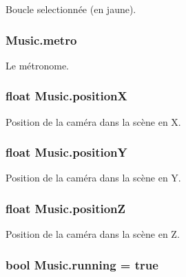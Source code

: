 Boucle selectionnée (en jaune). 

\hypertarget{class_music_a64db98945116f90a7af2ef7eec3cf232}{}
\subsubsection[{metro}]{ Music.\+metro}\label{class_music_a64db98945116f90a7af2ef7eec3cf232}


Le métronome. 

\hypertarget{class_music_a70cf89c5732793d69cce59b44b3e47f4}{}
\subsubsection[{position\+X}]{\setlength{\rightskip}{0pt plus 5cm}float Music.\+position\+X}\label{class_music_a70cf89c5732793d69cce59b44b3e47f4}


Position de la caméra dans la scène en X. 

\hypertarget{class_music_a4d7d0c2af4148f072c1fb3ef94bbdc13}{}
\subsubsection[{position\+Y}]{\setlength{\rightskip}{0pt plus 5cm}float Music.\+position\+Y}\label{class_music_a4d7d0c2af4148f072c1fb3ef94bbdc13}


Position de la caméra dans la scène en Y. 

\hypertarget{class_music_a52ba6dc0dbd78bf134fdd6d7b6c563e9}{}
\subsubsection[{position\+Z}]{\setlength{\rightskip}{0pt plus 5cm}float Music.\+position\+Z}\label{class_music_a52ba6dc0dbd78bf134fdd6d7b6c563e9}


Position de la caméra dans la scène en Z. 

\hypertarget{class_music_a0a0e48756d3ed859fd7bba17aa529732}{}
\subsubsection[{running}]{\setlength{\rightskip}{0pt plus 5cm}bool Music.\+running = true\hspace{0.3cm}{\ttfamily [private]}}\label{class_music_a0a0e48756d3ed859fd7bba17aa529732}


